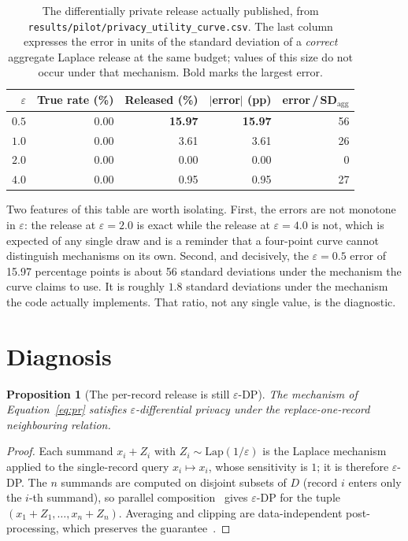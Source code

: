 \documentclass[journal]{IEEEtran}
\newtheorem{proposition}[theorem]{Proposition}
\theoremstyle{definition}
\newcommand{\WorstRelease}{15.97}
\newcommand{\WorstErrSD}{56}
\begin{document}
\begin{table}[t]
\centering
\caption{The differentially private release actually published, from
\texttt{results/\allowbreak{}pilot/\allowbreak{}privacy\_\allowbreak{}utility\_\allowbreak{}curve.\allowbreak{}csv}. The last column expresses the
error in units of the standard deviation of a \emph{correct} aggregate Laplace
release at the same budget; values of this size do not occur under that
mechanism. Bold marks the largest error.}
\label{tab:released}
\small
\setlength{\tabcolsep}{4pt}
\begin{tabular}{rrrrr}
\toprule
$\varepsilon$ & True rate (\%) & Released (\%) & $|$error$|$ (pp) & error\,/\,SD$_{\mathrm{agg}}$ \\
\midrule
$0.5$ & 0.00 & \textbf{15.97} & \textbf{15.97} & 56 \\
$1.0$ & 0.00 & 3.61 & 3.61 & 26 \\
$2.0$ & 0.00 & 0.00 & 0.00 & 0 \\
$4.0$ & 0.00 & 0.95 & 0.95 & 27 \\
\bottomrule
\end{tabular}
\end{table}

Two features of this table are worth isolating. First, the errors are not
monotone in $\varepsilon$: the release at $\varepsilon=2.0$ is exact while the
release at $\varepsilon=4.0$ is not, which is expected of any single draw and is
a reminder that a four-point curve cannot distinguish mechanisms on its own.
Second, and decisively, the $\varepsilon=0.5$ error of \WorstRelease{} percentage
points is about \WorstErrSD{} standard deviations under the mechanism the curve
claims to use. It is roughly $1.8$ standard deviations under the mechanism the
code actually implements. That ratio, not any single value, is the diagnostic.

\section{Diagnosis}
\label{sec:diagnosis}

\begin{proposition}[The per-record release is still $\varepsilon$-DP]
\label{prop:privacy}
The mechanism of Equation~\eqref{eq:pr} satisfies $\varepsilon$-differential
privacy under the replace-one-record neighbouring relation.
\end{proposition}

\begin{proof}
Each summand $x_i + Z_i$ with $Z_i \sim \mathrm{Lap}(1/\varepsilon)$ is the
Laplace mechanism applied to the single-record query $x_i \mapsto x_i$, whose
sensitivity is $1$; it is therefore $\varepsilon$-DP. The $n$ summands are
computed on disjoint subsets of $D$ (record $i$ enters only the $i$-th summand),
so parallel composition~\cite{mcsherry2009pinq} gives $\varepsilon$-DP for the
tuple $(x_1+Z_1,\dots,x_n+Z_n)$. Averaging and clipping are data-independent
post-processing, which preserves the guarantee~\cite{dwork2014algorithmic}.
\end{proof}
\end{document}
